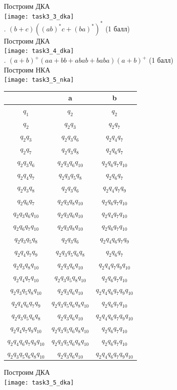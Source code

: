 \documentclass{article}
\begin{document}
\normalsize{Построим  ДКА}\\
\hfill \break
\texttt{[image: task3\_3\_dka]}\\
\hfill {}. \((b + c)((ab)^*c + (ba)^*)^*\) (1 балл)\\
\hfill \break
\normalsize{Построим  ДКА}\\
\hfill \break
\texttt{[image: task3\_4\_dka]}\\
\hfill {}. \((a+b)^+(aa+bb+abab+baba)(a+b)^+\) (1 балл)\\
\hfill \break
\normalsize{Построим  НКА}\\
\hfill \break
\texttt{[image: task3\_5\_nka]}\\
\hfill \break
\begin{center}
\begin{tabular} {|c |c |c|}
\hline
 & a & b \\
\hline
\(q_1\) & \(q_2\) & \(q_2\) \\
\hline
\(q_2\) & \(q_2q_3\) & \(q_2q_7\) \\
\hline
\(q_2q_3\) & \(q_2q_3q_6\) & \(q_2q_4q_7\) \\
\hline
\(q_2q_7\) & \(q_2q_3q_8\) & \(q_2q_6q_7\) \\
\hline
\(q_2q_3q_6\) & \(q_2q_3q_6q_{10}\) & \(q_2q_6q_7q_{10}\) \\
\hline
\(q_2q_4q_7\) & \(q_2q_3q_5q_8\) & \(q_2q_6q_7\) \\
\hline
\(q_2q_3q_8\) & \(q_2q_3q_6\) & \(q_2q_4q_7q_9\) \\
\hline
\(q_2q_6q_7\) & \(q_2q_3q_8q_{10}\) & \(q_2q_6q_7q_{10}\) \\
\hline
\(q_2q_3q_6q_{10}\) & \(q_2q_3q_6q_{10}\) & \(q_2q_4q_7q_{10}\) \\
\hline
\(q_2q_6q_7q_{10}\) & \(q_2q_3q_8q_{10}\) & \(q_2q_6q_7q_{10}\) \\
\hline
\(q_2q_3q_5q_8\) & \(q_2q_3q_6\) & \(q_2q_4q_6q_7q_9\) \\
\hline
\(q_2q_4q_7q_9\) & \(q_2q_3q_5q_6q_8\) & \(q_2q_6q_7\) \\
\hline
\(q_2q_3q_8q_{10}\) & \(q_2q_3q_6q_{10}\) & \(q_2q_4q_7q_9q_{10}\) \\
\hline
\(q_2q_4q_7q_{10}\) & \(q_2q_3q_5q_8q_{10}\) & \(q_2q_6q_7q_{10}\) \\
\hline
\(q_2q_3q_5q_8q_{10}\) & \(q_2q_3q_6q_{10}\) & \(q_2q_4q_6q_7q_9q_{10}\) \\
\hline
\(q_2q_4q_6q_7q_9\) & \(q_2q_3q_5q_6q_8q_{10}\) & \(q_2q_6q_7q_{10}\) \\
\hline
\(q_2q_3q_5q_6q_8\) & \(q_2q_3q_6q_{10}\) & \(q_2q_4q_6q_7q_9q_{10}\) \\
\hline
\(q_2q_4q_7q_9q_{10}\) & \(q_2q_3q_5q_6q_8q_{10}\) & \(q_2q_6q_7q_{10}\) \\
\hline
\(q_2q_4q_6q_7q_9q_{10}\) & \(q_2q_3q_5q_6q_8q_{10}\) & \(q_2q_6q_7q_{10}\) \\
\hline
\(q_2q_3q_5q_6q_8q_{10}\) & \(q_2q_3q_6q_{10}\) & \(q_2q_4q_6q_7q_9q_{10}\) \\
\hline
\end{tabular}
\end{center}
\hfill \break
\normalsize{Построим  ДКА}\\
\texttt{[image: task3\_5\_dka]}\\
\end{document}
